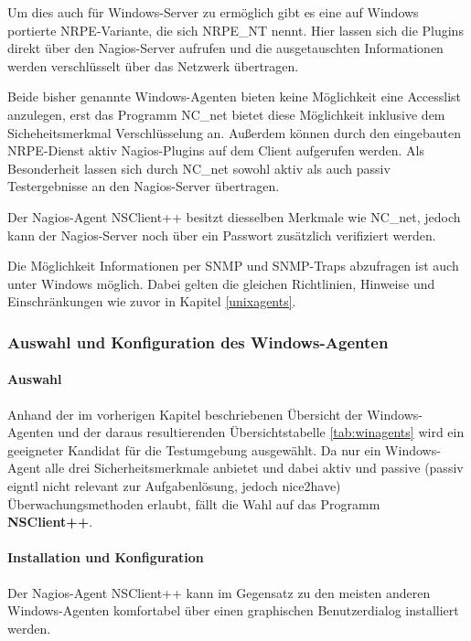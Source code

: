 Um dies auch für Windows-Server zu ermöglich gibt es eine auf Windows portierte \gls{NRPE}-Variante, die sich NRPE\_NT nennt.
Hier lassen sich die Plugins direkt über den Nagios-Server aufrufen und die ausgetauschten Informationen werden verschlüsselt über das Netzwerk übertragen.

Beide bisher genannte Windows-Agenten bieten keine Möglichkeit eine Accesslist anzulegen, erst das Programm NC\_net bietet diese Möglichkeit inklusive dem Sicheheitsmerkmal Verschlüsselung an.
Außerdem können durch den eingebauten \gls{NRPE}-Dienst aktiv Nagios-Plugins auf dem Client aufgerufen werden.
Als Besonderheit lassen sich durch NC\_net sowohl aktiv als auch passiv Testergebnisse an den Nagios-Server übertragen. 

Der Nagios-Agent NSClient++ besitzt diesselben Merkmale wie NC\_net, jedoch kann der Nagios-Server noch über ein Passwort zusätzlich verifiziert werden.

Die Möglichkeit Informationen per \gls{SNMP} und \gls{SNMP}-Traps abzufragen ist auch unter Windows möglich.
Dabei gelten die gleichen Richtlinien, Hinweise und Einschränkungen wie zuvor in Kapitel \ref{unixagents}.

\subsubsection{Auswahl und Konfiguration des Windows-Agenten}

\paragraph{Auswahl}
Anhand der im vorherigen Kapitel beschriebenen Übersicht der Windows-Agenten und der daraus resultierenden Übersichtstabelle \ref{tab:winagents} wird ein geeigneter Kandidat für die Testumgebung ausgewählt.
Da nur ein Windows-Agent alle drei Sicherheitsmerkmale anbietet und dabei aktiv und passive (passiv eigntl nicht relevant zur Aufgabenlösung, jedoch nice2have) Überwachungsmethoden erlaubt, fällt die Wahl auf das Programm \textbf{NSClient++}.

\paragraph{Installation und Konfiguration}

Der Nagios-Agent NSClient++ kann im Gegensatz zu den meisten anderen Windows-Agenten komfortabel über einen graphischen Benutzerdialog installiert werden.

